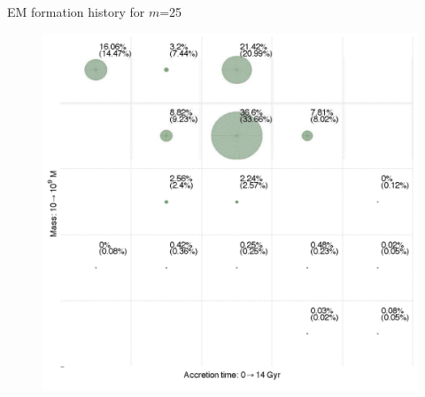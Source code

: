 \documentclass{beamer}
\begin{document}
\begin{frame}{EM formation history for $m$=25}
	
	\begin{figure}
			\begin{center}
				\includegraphics[scale=0.3]{h3fh.pdf}
			\end{center}
	\end{figure}
	
\end{frame}
\end{document}
